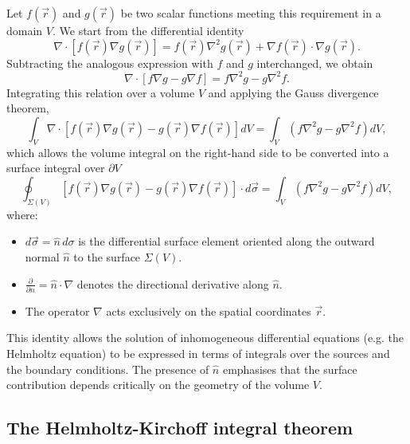 		Let $f(\vec{r})$ and $g(\vec{r})$ be two scalar functions meeting this requirement in a domain $V$. We start from the differential identity
		\begin{equation}
			\nabla \cdot \left[ f(\vec{r})\nabla g(\vec{r}) \right] = f(\vec{r})\nabla^{2}g(\vec{r}) + \nabla f(\vec{r}) \cdot \nabla g(\vec{r}).
		\end{equation}
		Subtracting the analogous expression with $f$ and $g$ interchanged, we obtain
		\begin{equation}
			\nabla \cdot \left[ f\nabla g - g\nabla f \right] = f\nabla^{2}g - g\nabla^{2}f.
		\end{equation}
		Integrating this relation over a volume $V$ and applying the Gauss divergence theorem,
		\begin{equation}
			\int_{V} \nabla \cdot \left[ f(\vec{r})\nabla g(\vec{r}) - g(\vec{r})\nabla f(\vec{r}) \right] dV = \int_{V} \left( f\nabla^{2}g - g\nabla^{2}f \right) dV,
		\end{equation}
		which allows the volume integral on the right-hand side to be converted into a surface integral over $\partial V$
		\begin{equation}
			\oint_{\Sigma(V)} \left[ f(\vec{r})\nabla g(\vec{r}) - g(\vec{r})\nabla f(\vec{r}) \right] \cdot d\vec{\sigma} = \int_V \left( f\nabla^2 g - g\nabla^2 f \right) dV,
		\end{equation}
		where:
		\begin{itemize}
			\item $ d\vec{\sigma} = \hat{n}\, d\sigma $ is the differential surface element oriented along the outward normal $\hat{n}$ to the surface $\Sigma(V)$.
			\item $\frac{\partial}{\partial n} = \hat{n} \cdot \nabla$ denotes the directional derivative along $\hat{n}$.
			\item The operator $\nabla$ acts exclusively on the spatial coordinates $\vec{r}$.
		\end{itemize}

		This identity allows the solution of inhomogeneous differential equations (e.g. the Helmholtz equation) to be expressed in terms of integrals over the sources and the boundary conditions. The presence of $\hat{n}$ emphasises that the surface contribution depends critically on the geometry of the volume $V$.

	\subsection{The Helmholtz-Kirchoff integral theorem}

